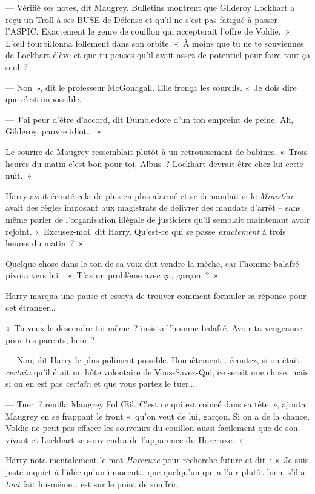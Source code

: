 --- Vérifié ses notes, dit Maugrey.
Bulletins montrent que Gilderoy Lockhart a reçu un Troll à ses BUSE de Défense et qu'il ne s'est pas fatigué à passer l'ASPIC.
Exactement le genre de couillon qui accepterait l'offre de Voldie.~»
L'œil tourbillonna follement dans son orbite.
«~À moins que tu ne te souviennes de Lockhart élève et que tu penses qu'il avait assez de potentiel pour faire tout ça seul~?

--- Non~», dit le professeur McGonagall.
Elle fronça les sourcils.
«~Je dois dire que c'est impossible.

--- J'ai peur d'être d'accord, dit Dumbledore d'un ton empreint de peine.
Ah, Gilderoy, pauvre idiot…~»

Le sourire de Maugrey ressemblait plutôt à un retroussement de babines.
«~Trois heures du matin c'est bon pour toi, Albus~?
Lockhart devrait être chez lui cette nuit.~»

Harry avait écouté cela de plus en plus alarmé et se demandait si le \emph{Ministère} avait des règles imposant aux magistrats de délivrer des mandats d'arrêt -- sans même parler de l'organisation illégale de justiciers qu'il semblait maintenant avoir rejoint.
«~Excusez-moi, dit Harry.
Qu'est-ce qui se passe \emph{exactement} à trois heures du matin~?~»

Quelque chose dans le ton de sa voix dut vendre la mèche, car l'homme balafré pivota vers lui~: «~T'as un problème avec ça, garçon~?~»

Harry marqua une pause et essaya de trouver comment formuler sa réponse pour cet étranger…

«~Tu veux le descendre toi-même~? insista l'homme balafré.
Avoir ta vengeance pour tes parents, hein~?

--- Non, dit Harry le plus poliment possible.
Honnêtement… écoutez, si on était \emph{certain} qu'il était un hôte volontaire de Vous-Savez-Qui, ce serait une chose, mais si on en est pas \emph{certain} et que vous partez le tuer…

--- Tuer~? renifla Maugrey Fol Œil.
C'est ce qui est coincé dans sa tête~», ajouta Maugrey en se frappant le front «~qu'on veut de lui, garçon.
Si on a de la chance, Voldie ne peut pas effacer les souvenirs du couillon aussi facilement que de son vivant et Lockhart se souviendra de l'apparence du Horcruxe.~»

Harry nota mentalement le mot \emph{Horcruxe} pour recherche future et dit~: «~Je suis juste inquiet à l'idée qu'un innocent… que quelqu'un qui a l'air plutôt bien, s'il a \emph{tout} fait lui-même… est sur le point de souffrir.

